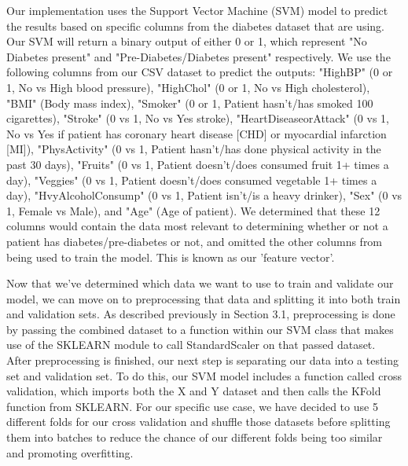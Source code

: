 \documentclass[11pt]{article}
\begin{document}
Our implementation uses the Support Vector Machine (SVM) model to predict the results based on specific columns from the diabetes dataset that are using. Our SVM will return a binary output of either 0 or 1, which represent "No Diabetes present" and "Pre-Diabetes/Diabetes present" respectively. We use the following columns from our CSV dataset to predict the outputs: "HighBP" (0 or 1, No vs High blood pressure), "HighChol" (0 or 1, No vs High cholesterol), "BMI" (Body mass index), "Smoker" (0 or 1, Patient hasn't/has smoked 100 cigarettes), "Stroke" (0 vs 1, No vs Yes stroke), "HeartDiseaseorAttack" (0 vs 1, No vs Yes if patient has coronary heart disease [CHD] or myocardial infarction [MI]), "PhysActivity" (0 vs 1, Patient hasn't/has done physical activity in the past 30 days), "Fruits" (0 vs 1, Patient doesn't/does consumed fruit 1+ times a day), "Veggies" (0 vs 1, Patient doesn't/does consumed vegetable 1+ times a day), "HvyAlcoholConsump" (0 vs 1, Patient isn't/is a heavy drinker), "Sex" (0 vs 1, Female vs Male), and "Age" (Age of patient). We determined that these 12 columns would contain the data most relevant to determining whether or not a patient has diabetes/pre-diabetes or not, and omitted the other columns from being used to train the model. This is known as our 'feature vector'.

Now that we've determined which data we want to use to train and validate our model, we can move on to preprocessing that data and splitting it into both train and validation sets. As described previously in Section 3.1, preprocessing is done by passing the combined dataset to a function within our SVM class that makes use of the SKLEARN module to call StandardScaler on that passed dataset. After preprocessing is finished, our next step is separating our data into a testing set and validation set. To do this, our SVM model includes a function called cross validation, which imports both the X and Y dataset and then calls the KFold function from SKLEARN. For our specific use case, we have decided to use 5 different folds for our cross validation and shuffle those datasets before splitting them into batches to reduce the chance of our different folds being too similar and promoting overfitting. 
\end{document}
